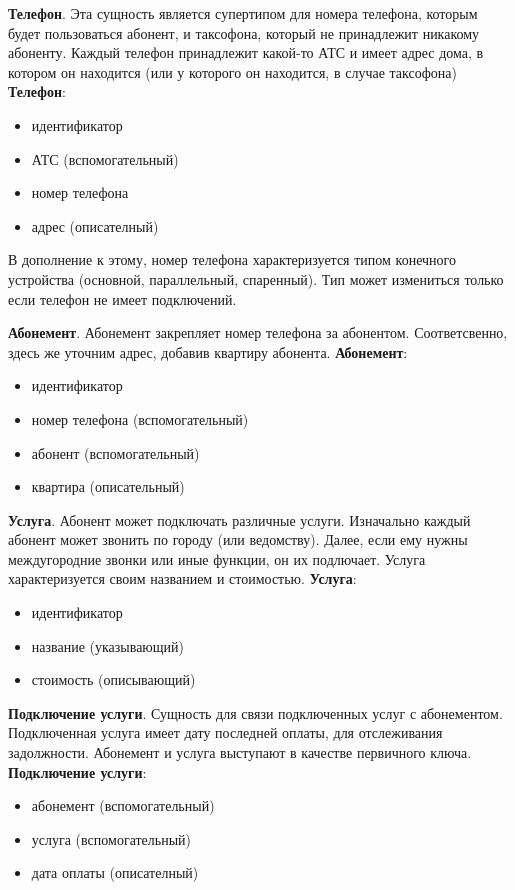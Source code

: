 \documentclass{report}
\begin{document}
\textbf{Телефон}. Эта сущность является супертипом для номера телефона, 
которым будет пользоваться абонент, и таксофона, который не принадлежит
никакому абоненту. Каждый телефон принадлежит какой-то АТС и имеет адрес дома,
в котором он находится (или у которого он находится, в случае таксофона)
\newline\textbf{Телефон}:
\begin{itemize}
    \item идентификатор
    \item АТС (вспомогательный)
    \item номер телефона
    \item адрес (описателный)
\end{itemize}
В дополнение к этому, номер телефона характеризуется 
типом конечного устройства (основной, параллельный, спаренный). 
Тип может измениться только если телефон не имеет подключений.

\textbf{Абонемент}. Абонемент закрепляет номер телефона за абонентом.
Соответсвенно, здесь же уточним адрес, добавив квартиру абонента. 
\newline\textbf{Абонемент}:
\begin{itemize}
    \item идентификатор
    \item номер телефона (вспомогательный)
    \item абонент (вспомогательный)
    \item квартира (описательный)
\end{itemize}

\textbf{Услуга}. Абонент может подключать различные услуги. Изначально 
каждый абонент может звонить по городу (или ведомству). Далее, если 
ему нужны междугородние звонки или иные функции, он их подлючает. Услуга
характеризуется своим названием и стоимостью.
\newline\textbf{Услуга}:
\begin{itemize}
    \item идентификатор
    \item название (указывающий)
    \item стоимость (описывающий)
\end{itemize}

\textbf{Подключение услуги}. Сущность для связи подключенных услуг с 
абонементом. Подключенная услуга имеет дату последней оплаты, для отслеживания
задолжности. Абонемент и услуга выступают в качестве первичного ключа.
\newline\textbf{Подключение услуги}:
\begin{itemize}
    \item абонемент (вспомогательный)
    \item услуга (вспомогательный)
    \item дата оплаты (описателный)
\end{itemize}
\end{document}
